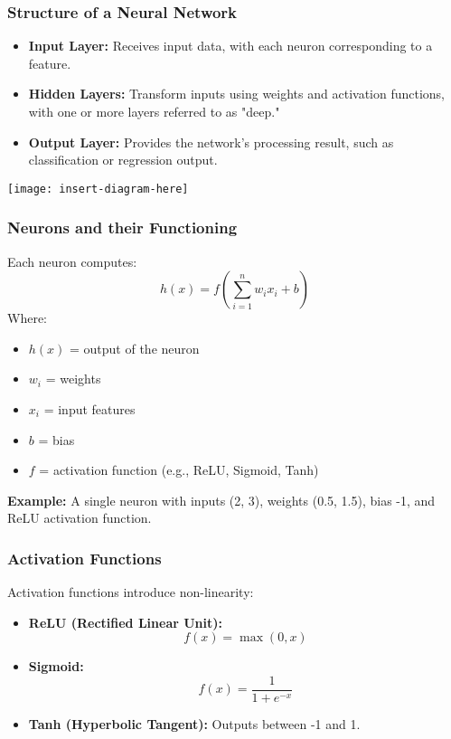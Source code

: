 \documentclass{beamer}
\begin{document}
\begin{frame}[fragile]
    \frametitle{Structure of a Neural Network}
    \begin{itemize}
        \item \textbf{Input Layer:} Receives input data, with each neuron corresponding to a feature.
        \item \textbf{Hidden Layers:} Transform inputs using weights and activation functions, with one or more layers referred to as "deep."
        \item \textbf{Output Layer:} Provides the network's processing result, such as classification or regression output.
    \end{itemize}
    \begin{center}
        \texttt{[image: insert-diagram-here]}
    \end{center}
\end{frame}

\begin{frame}[fragile]
    \frametitle{Neurons and their Functioning}
    Each neuron computes:
    \begin{equation}
        h(x) = f\left(\sum_{i=1}^{n} w_i x_i + b\right)
    \end{equation}
    Where:
    \begin{itemize}
        \item \( h(x) \) = output of the neuron
        \item \( w_i \) = weights
        \item \( x_i \) = input features
        \item \( b \) = bias
        \item \( f \) = activation function (e.g., ReLU, Sigmoid, Tanh)
    \end{itemize}
    \vspace{1em}
    \textbf{Example:} A single neuron with inputs (2, 3), weights (0.5, 1.5), bias -1, and ReLU activation function.
\end{frame}

\begin{frame}[fragile]
    \frametitle{Activation Functions}
    Activation functions introduce non-linearity:
    \begin{itemize}
        \item \textbf{ReLU (Rectified Linear Unit):} 
        \[
        f(x) = \max(0, x)
        \]
        \item \textbf{Sigmoid:} 
        \[
        f(x) = \frac{1}{1 + e^{-x}}
        \]
        \item \textbf{Tanh (Hyperbolic Tangent):} Outputs between -1 and 1.
    \end{itemize}
\end{frame}
\end{document}
